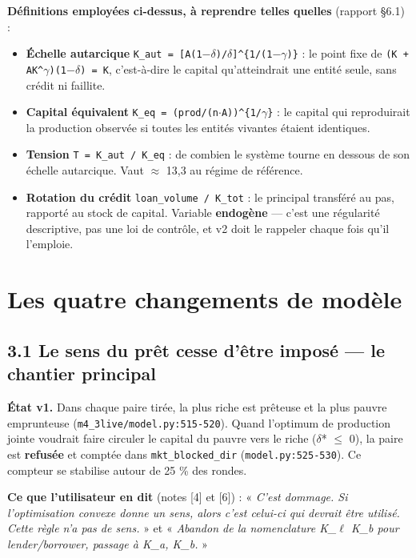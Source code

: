 \documentclass[11pt,a4paper]{article}
\newcommand{\code}[1]{\texttt{#1}}
\begin{document}
\textbf{Définitions employées ci-dessus, à reprendre telles quelles} (rapport §6.1) :

\begin{itemize}
\item \textbf{Échelle autarcique} \code{K\_aut = [A(1\ensuremath{-}\ensuremath{\delta})/\ensuremath{\delta}]\textasciicircum{}\{1/(1\ensuremath{-}\ensuremath{\gamma})\}} : le point fixe de \code{(K + AK\textasciicircum{}\ensuremath{\gamma})(1\ensuremath{-}\ensuremath{\delta}) = K}, c'est-à-dire le capital qu'atteindrait une entité seule, sans crédit ni faillite.
\item \textbf{Capital équivalent} \code{K\_eq = (prod/(n\ensuremath{\cdot}A))\textasciicircum{}\{1/\ensuremath{\gamma}\}} : le capital qui reproduirait la production observée si toutes les entités vivantes étaient identiques.
\item \textbf{Tension} \code{T = K\_aut / K\_eq} : de combien le système tourne en dessous de son échelle autarcique. Vaut \ensuremath{\approx} 13,3 au régime de référence.
\item \textbf{Rotation du crédit} \code{loan\_volume / K\_tot} : le principal transféré au pas, rapporté au stock de capital. Variable \textbf{endogène} --- c'est une régularité descriptive, pas une loi de contrôle, et v2 doit le rappeler chaque fois qu'il l'emploie.
\end{itemize}

\bigskip

\setcounter{section}{2}
\section{Les quatre changements de modèle}

\subsection*{3.1 Le sens du prêt cesse d'être imposé --- \textbf{le chantier principal}}

\textbf{État v1.} Dans chaque paire tirée, la plus riche est prêteuse et la plus pauvre emprunteuse (\code{m4\_3live/model.py:515-520}). Quand l'optimum de production jointe voudrait faire circuler le capital du pauvre vers le riche (\ensuremath{\delta}* \ensuremath{\leq} 0), la paire est \textbf{refusée} et comptée dans \code{mkt\_blocked\_dir} (\code{model.py:525-530}). Ce compteur se stabilise autour de 25 \% des rondes.

\textbf{Ce que l'utilisateur en dit} (notes [4] et [6]) : « \emph{C'est dommage. Si l'optimisation convexe donne un sens, alors c'est celui-ci qui devrait être utilisé. Cette règle n'a pas de sens.} » et « \emph{Abandon de la nomenclature K\_\ensuremath{\ell} K\_b pour lender/borrower, passage à K\_a, K\_b.} »
\end{document}
